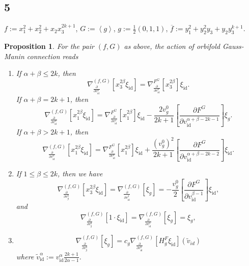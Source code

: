 \documentclass[reqno,12pt]{amsart}
\numberwithin{equation}{section}
\theoremstyle{plain}
\newtheorem{proposition}[theorem]{Proposition}
\def\p{\partial }
\theoremstyle{definition}
\newcommand{\CC}{{\mathbb{C}}}
\newcommand{\Jac}{\mathrm{Jac}}
\newcommand{\id}{\mathrm{id}}
\def\T{{\mathcal T}}
\numberwithin{equation}{section}
\begin{document}
\subsection*{5} 
$f:=x_1^{2}+x_2^2+x_2x_3^{2k+1}$, $G:=\left<g\right>$, $g:=\frac{1}{2}(0,1,1)$,  $\overline{f}:=y_1^2+y_2^2y_3+y_2y_3^{k+1}$.
% 
% 
%     
%     

\begin{proposition}{\label{EF4}}
    For the pair $(f,G)$ as above, the action of orbifold Gauss-Manin connection reads
\begin{enumerate}
\item If $\alpha+\beta \le 2k$, then
\[
\nabla_{\frac{\partial}{\partial v^\alpha_{\id}}}^{(f,G)}[x_3^{2\beta}\xi_{\id}] = \nabla^{F^G}_{\frac{\partial}{\partial v^\alpha_{\id}}}[x_3^{2\beta}]\xi_{\id}.
\]
If $\alpha+\beta = 2k+1$, then
\[
\nabla_{\frac{\partial}{\partial v^\alpha_{\id}}}^{(f,G)}[x_1^{2\beta}\xi_{\id}] = \nabla^{F^G}_{\frac{\partial}{\partial v^\alpha_{\id}}}[x_1^{2\beta}]\xi_{\id} - \frac{2v_g^0}{2k+1} \left[\frac{\p F^G}{\p v_\id^{\alpha+\beta-2k-1}}\right]
\xi_{g}.
\]
If $\alpha+\beta > 2k+1$, then
\[
\nabla_{\frac{\partial}{\partial v^\alpha_{\id}}}^{(f,G)}[x_1^{2\beta}\xi_{\id}] = \nabla^{F^G}_{\frac{\partial}{\partial v^\alpha_{\id}}}[x_1^{2\beta}]\xi_{\id} + \frac{(v_g^0)^2}{2k+1} 
\left[\frac{\p F^G}{\p v_\id^{\alpha+\beta-2k-2}}\right]\xi_{\id}.
\]

\item If $1 \le \beta \le 2k$, then we have
\[
\nabla_{\frac{\partial}{\partial v^0_{g}}}^{(f,G)}[x_3^{2\beta}\xi_{\id}] = \nabla_{\frac{\partial}{\partial v^\beta_{\id}}}^{(f,G)}[\xi_{g}] = - \frac{v_g^0}{2}\left[\frac{\partial F^G}{\partial v^{\beta-1}_{\id}}\right]\xi_{\id},
\]
and
\[
\nabla_{\frac{\partial}{\partial v^0_{g}}}^{(f,G)}[1 \cdot \xi_{\id}] 
= \nabla_{\frac{\partial}{\partial v^0_{\id}}}^{(f,G)}[\xi_{g}] 
= \xi_g,
\]
\item 
\[
        \nabla_{\frac{\partial}{\partial v^0_{g}}}^{(f,G)}[\xi_{g}] = 
        c_g \nabla_{\frac{\partial}{\partial v^0_{\id}}}^{(f,G)}[H^F_g \xi_{\id}](\widetilde v_{id})
    \]
where $\widetilde v_{\id}^{\alpha} := v_{\id}^{\alpha} \frac{2k + 1}{2\alpha -1}$.    

\end{enumerate}
\end{proposition}
\end{document}

